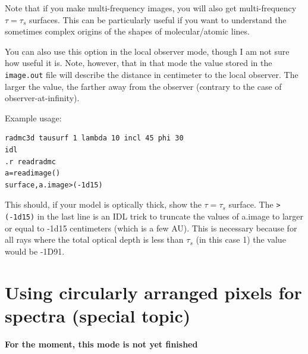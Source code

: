 \documentclass{report}
\newenvironment{asciibox}%
  {\begin{list}{}{%
    \setlength{\topsep}{0.5em}%
    \setlength{\parskip}{0em}%
    \setlength{\parsep}{0em}%
    \setlength{\itemsep}{0em}%
    \setlength{\rightmargin}{0em}%
    \setlength{\leftmargin}{3.0em}%
    \setlength{\labelsep}{1em}%
    \setlength{\labelwidth}{2em}%
  }\normalfont\footnotesize\item}
  {\end{list}}
\begin{document}
Note that if you make multi-frequency images, you will also get
multi-frequency $\tau=\tau_s$ surfaces. This can be particularly useful if
you want to understand the sometimes complex origins of the shapes of
molecular/atomic lines.

You can also use this option in the local observer mode, though I am not
sure how useful it is. Note, however, that in that mode the value stored in
the {\small\tt image.out} file will describe the distance in centimeter to
the local observer. The larger the value, the farther away from the observer
(contrary to the case of observer-at-infinity).

Example usage:
\begin{asciibox}\begin{verbatim}
radmc3d tausurf 1 lambda 10 incl 45 phi 30
idl
.r readradmc
a=readimage()
surface,a.image>(-1d15)
\end{verbatim}\end{asciibox}
This should, if your model is optically thick, show the $\tau=\tau_s$
surface. The {\small\tt >(-1d15)} in the last line is an IDL trick to
truncate the values of a.image to larger or equal to -1d15 centimeters
(which is a few AU). This is necessary because for all rays where the
total optical depth is less than $\tau_s$ (in this case 1) the value
would be -1D91.


\section{Using circularly arranged pixels for spectra (special topic)}
\label{sec-circular-pixel-arrangement}
%
{\bf For the moment, this mode is not yet finished}
%
% 
% 
% 
\end{document}
